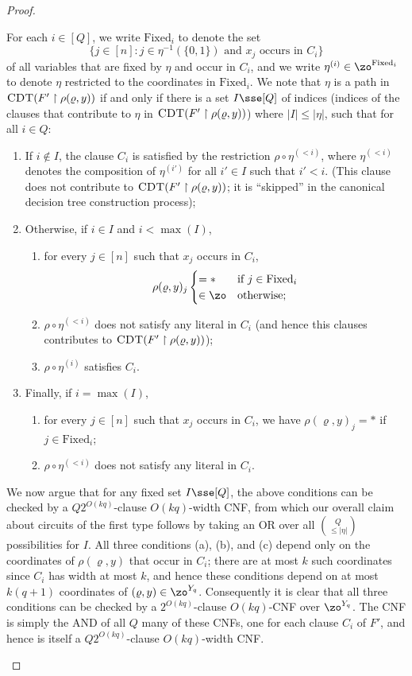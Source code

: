 \documentclass[11pt]{article}
\numberwithin{equation}{section}
\theoremstyle{definition}
\theoremstyle{plain}
\theoremstyle{plain}
\newcommand{\uhr}{\upharpoonright}
\newcommand{\CDT}{\textsc{CDT}}
\newcommand{\Fixed}{\mathrm{Fixed}}
\begin{document}
\begin{proof}
\begin{enumerate}
For each $i\in [Q]$, we write $\Fixed_i$ to denote the set 
\[ \{ j \in [n] \colon \text{$j \in \eta^{-1}(\{0,1\})$ and $x_j$ occurs in $C_i$}\}\]
of all variables that are fixed by $\eta$ and occur in $C_i$, and we write  $\eta^{(i)} \in \zo^{\Fixed_i}$ to denote $\eta$ restricted to the coordinates in $\Fixed_i$.  We note that $\eta$ is a path in $\CDT(F'\uhr \rho(\varrho,y))$ if and only if there is a set $I\sse [Q]$ of indices (indices of the clauses that contribute to $\eta$ in $\CDT(F'\uhr\rho(\varrho,y))$) where $|I|\le |\eta|$, such that for all $i \in Q$: 
\begin{enumerate}
\item[(a)] If $i \notin I$, the clause $C_i$ is satisfied by the restriction $\rho \circ \eta^{(< i)}$, where $\eta^{(<i)}$ denotes the composition of $\eta^{(i')}$ for all $i' \in I$ such that $i' < i$. (This clause does not contribute to $\CDT(F'\uhr \rho(\varrho,y))$; it is ``skipped'' in the canonical decision tree construction process); 
\item[(b)] Otherwise, if $i \in I$ and $i < \max(I)$, 
\begin{enumerate}
\item[(i)] for every $j \in [n]$ such that $x_j$ occurs in $C_i$, 
\[ \rho(\varrho,y)_j  \begin{cases}
= * & \text{if $j\in \Fixed_i$}  \\
\in \zo & \text{otherwise};
\end{cases} \] 
\item[(ii)] $\rho \circ \eta^{(<i)}$  does not satisfy any literal in $C_i$ (and hence this clauses contributes to $\CDT(F'\uhr\rho(\varrho,y))$);
\item[(iii)] $\rho\circ \eta^{(i)}$ satisfies $C_i$.
\end{enumerate}
\item[(c)] Finally, if $i = \max(I)$,
\begin{enumerate}
\item[(i)] for every $j\in [n]$ such that $x_j$ occurs in $C_i$, we have $\rho(\varrho,y)_j = *$ if $j \in \Fixed_i$;
\item[(ii)] $\rho\circ \eta^{(<i)}$ does not satisfy any literal in $C_i$.
\end{enumerate} 
\end{enumerate} 

We now argue that for any fixed set $I \sse [Q]$, the above conditions can be checked by a $Q2^{O(kq)}$-clause $O(kq)$-width CNF, from which our overall claim about circuits of the first type follows by taking an OR over all ${Q\choose \le |\eta|}$ possibilities for $I$.  All three conditions (a), (b), and (c) depend only on the coordinates of $\rho(\varrho,y)$ that occur in $C_i$; there are at most $k$ such coordinates since $C_i$ has width at most $k$, and hence these conditions depend on at most $k(q+1)$ coordinates of $(\varrho,y) \in \zo^{Y_q}$. Consequently it is clear that all three conditions can be checked by a $2^{O(kq)}$-clause $O(kq)$-CNF over $\zo^{Y_q}$.  The CNF is simply the AND of all $Q$ many of these CNFs, one for each clause $C_i$ of $F'$, and hence is itself a $Q2^{O(kq)}$-clause $O(kq)$-width CNF.


\end{enumerate}
\end{proof}
\end{document}
